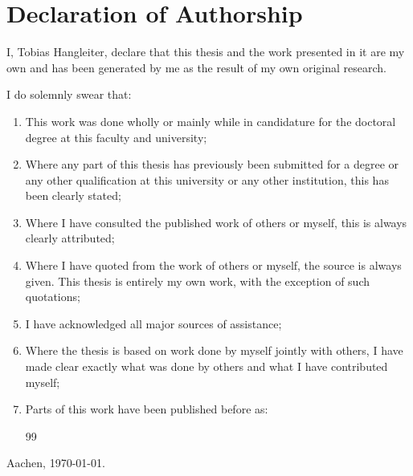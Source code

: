 \chapter{Declaration of Authorship}\label{ch:declaration-of-authorship}
I, Tobias Hangleiter, declare that this thesis and the work presented in it are my own and has been generated by me as the result of my own original research.

I do solemnly swear that:
\begin{enumerate}
    \item This work was done wholly or mainly while in candidature for the doctoral degree at this faculty and university;
    \item Where any part of this thesis has previously been submitted for a degree or any other qualification at this university or any other institution, this has been clearly stated;
    \item Where I have consulted the published work of others or myself, this is always clearly attributed;
    \item Where I have quoted from the work of others or myself, the source is always given.
          This thesis is entirely my own work, with the exception of such quotations;
    \item I have acknowledged all major sources of assistance;
    \item Where the thesis is based on work done by myself jointly with others, I have made clear exactly what was done by others and what I have contributed myself;
    \item Parts of this work have been published before as: \begin{refsection}[thesispubs]
        \small
        \nocite{*} %
        { %
            \expandafter\def\csname blx@maxbibnames\endcsname{99}%
            \printbibliography[heading=none]
        }
    \end{refsection}
\end{enumerate}

\vspace{4cm}

Aachen, \today.